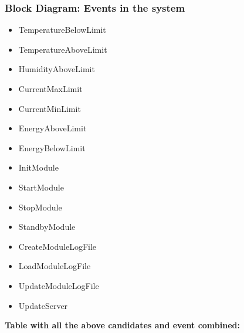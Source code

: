 \subsubsection{Block Diagram: Events in the system}
	\begin{itemize}
		\item TemperatureBelowLimit
		\item TemperatureAboveLimit
		\item HumidityAboveLimit
		\item CurrentMaxLimit
		\item CurrentMinLimit
		\item EnergyAboveLimit
		\item EnergyBelowLimit
		\item InitModule
		\item StartModule
		\item StopModule
		\item StandbyModule
		\item CreateModuleLogFile
		\item LoadModuleLogFile
		\item UpdateModuleLogFile
		\item UpdateServer
	\end{itemize}
\textbf{Table with all the above candidates and event combined:}
